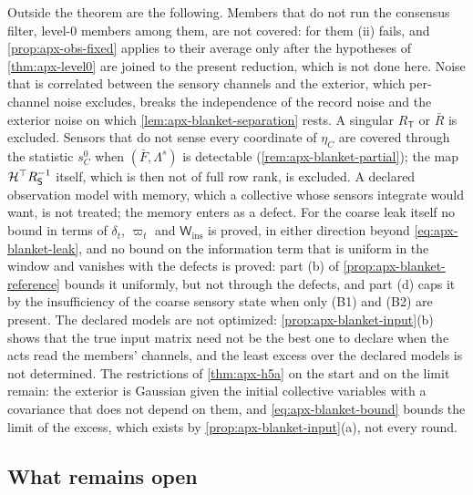 Outside the theorem are the following. Members that do not run the consensus filter, level-0 members among them, are not covered: for them (ii) fails, and \cref{prop:apx-obs-fixed} applies to their average only after the hypotheses of \cref{thm:apx-level0} are joined to the present reduction, which is not done here. Noise that is correlated between the sensory channels and the exterior, which per-channel noise excludes, breaks the independence of the record noise and the exterior noise on which \cref{lem:apx-blanket-separation} rests. A singular $R_{\mathsf T}$ or $\bar R$ is excluded. Sensors that do not sense every coordinate of $\eta_C$ are covered through the statistic $s^0_C$ when $(\bar F,\Lambda^s)$ is detectable (\cref{rem:apx-blanket-partial}); the map $\mathcal H^\top R_{\mathsf{S}}^{-1}$ itself, which is then not of full row rank, is excluded. A declared observation model with memory, which a collective whose sensors integrate would want, is not treated; the memory enters as a defect. For the coarse leak itself no bound in terms of $\delta_t$, $\varpi_t$ and $\mathsf W_{\mathrm{ins}}$ is proved, in either direction beyond \eqref{eq:apx-blanket-leak}, and no bound on the information term that is uniform in the window and vanishes with the defects is proved: part (b) of \cref{prop:apx-blanket-reference} bounds it uniformly, but not through the defects, and part (d) caps it by the insufficiency of the coarse sensory state when only (B1) and (B2) are present. The declared models are not optimized: \cref{prop:apx-blanket-input}(b) shows that the true input matrix need not be the best one to declare when the acts read the members' channels, and the least excess over the declared models is not determined. The restrictions of \cref{thm:apx-h5a} on the start and on the limit remain: the exterior is Gaussian given the initial collective variables with a covariance that does not depend on them, and \eqref{eq:apx-blanket-bound} bounds the limit of the excess, which exists by \cref{prop:apx-blanket-input}(a), not every round.

\subsection{What remains open}

